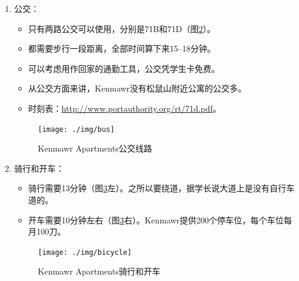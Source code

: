 \documentclass[nofonts,a4paper,11pt]{article}
\begin{document}
\begin{itemize}
\begin{enumerate}
\begin{itemize}
			\item 晚上回家会比较远，如果使用AB路线校车（图\ref{fig:shuttle}右上），则需要绕一圈。不过据初步观察，绕道经过的路线有很多餐馆，所以不妨好好享受一下晚餐再回家（校车间隔45分钟）。
			\item 如果晚上回家觉得坐校车不方便，可以考虑6:30 PM之后直接护送到家（图\ref{fig:shuttle}右下蓝色区域）。
			\item 时刻表：
			\begin{itemize}
				\item B线路（工作日）：7:15 AM -- 10:45 AM，4:30 PM -- 6:00 PM（每30分钟一班）
				\item AB线路（工作日）：11:15 AM -- 3:45 PM，6:30 PM -- 11:00 PM（每45分钟一班）
				\item AB线路（周末）：7:15 AM -- 11:45 AM，1:30 PM -- 6:00 PM，7:30 -- 11：15 PM （每45分钟一班）
				\item 护送（每天）：6:30 PM -- 6:30 AM （最后接送在6:00 AM）
			\end{itemize}
		\end{itemize}
		\begin{figure}[!htb]
			\centering
			\texttt{[image: ./img/shuttle]}
			\caption{Kenmawr Apartments校车与护送}
			\label{fig:shuttle}
		\end{figure}
		\item 公交：
		\begin{itemize}
			\item 只有两路公交可以使用，分别是71B和71D（图\ref{fig:bus}）。
			\item 都需要步行一段距离，全部时间算下来15--18分钟。
			\item 可以考虑用作回家的通勤工具，公交凭学生卡免费。
			\item 从公交方面来讲，Kenmawr没有松鼠山附近公寓的公交多。
			\item 时刻表：\url{http://www.portauthority.org/rt/71d.pdf}。
		\end{itemize}
		\begin{figure}[!htb]
			\centering
			\texttt{[image: ./img/bus]}
			\caption{Kenmawr Apartments公交线路}
			\label{fig:bus}
		\end{figure}
		\item 骑行和开车：
		\begin{itemize}
			\item 骑行需要13分钟（图\ref{fig:bicycle}左）。之所以要绕道，据学长说大道上是没有自行车道的。
			\item 开车需要10分钟左右（图\ref{fig:bicycle}右）。Kenmawr提供200个停车位，每个车位每月100刀。
		\end{itemize}
		\begin{figure}[!htb]
			\centering
			\texttt{[image: ./img/bicycle]}
			\caption{Kenmawr Apartments骑行和开车}
			\label{fig:bicycle}
		\end{figure}
	\end{enumerate}
\end{itemize}
\end{document}
